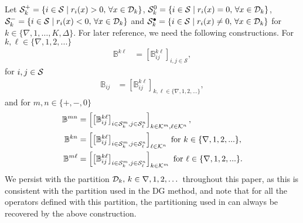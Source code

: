 Let \(\mathcal{S}_k^+=\{i\in\mathcal{S}\mid r_i(x)>0,\,\forall x \in\mathcal{D}_k\}\), \(\mathcal{S}_k^0=\{i\in\mathcal{S}\mid r_i(x)=0,\,\forall x \in\mathcal{D}_k\}\), \(\mathcal{S}_k^-=\{i\in\mathcal{S}\mid r_i(x)<0,\,\forall x \in\mathcal{D}_k\}\) and \(\mathcal{S}_k^\bullet=\{i\in\mathcal{S}\mid r_i(x)\neq0,\,\forall x \in\mathcal{D}_k\}\) for \(k\in\{\nabla,1,\dots,K,\Delta\}\). For later reference, we need the following constructions. For \(k,\ell\in\{\nabla,1,2,...\}\)
\begin{align}
	\mathbb B^{k\ell} & = \left[\mathbb B_{ij}^{k\ell}\right]_{i,j\in\mathcal S},\label{eqn:ref1here}
\end{align}
for \(i,j\in\mathcal{S}\) 
\begin{align}
	\mathbb B_{ij} & = \left[\mathbb B_{ij}^{k\ell}\right]_{k,\ell \in \{\nabla,1,2,\dots\}},
\end{align}
and for \(m,n\in\{+,-,0\}\) 
\begin{align}
	\mathbb B^{m n} &= \left[\left[\mathbb B_{ij}^{k\ell}\right]_{i\in\mathcal{S}_k^m,j\in\mathcal{S}_\ell^n}\right]_{k\in\mathcal K^m,\ell\in\mathcal K^n},\label{eqn: Bmn2 etc}
	\\ \mathbb B^{k n} &= \left[\left[\mathbb B_{ij}^{k\ell}\right]_{i\in\mathcal{S}_k^m,j\in\mathcal{S}_\ell^n}\right]_{\ell\in\mathcal K^n} \mbox{ for }k\in\{\nabla,1,2,...\},
	\\ \mathbb B^{m \ell} &= \left[\left[\mathbb B_{ij}^{k\ell}\right]_{i\in\mathcal{S}_k^m,j\in\mathcal{S}_\ell^n}\right]_{k\in\mathcal K^m} \mbox{ for } \ell\in\{\nabla,1,2,...\}.
	\label{eqn:ref2here}
\end{align}
We persist with the partition \(\mathcal{D}_k,\,k\in\nabla,1,2,\dots\) throughout this paper, as this is consistent with the partition used in the DG method, and note that for all the operators defined with this partition, the partitioning used in \citep{bo2014} can always be recovered by the above construction. 

